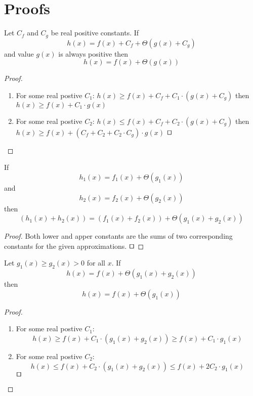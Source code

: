 \section{Proofs}
\label{sec:proofs_appendix}

\begin{lemma}
\label{lem:theta_constant}
Let $C_f$ and $C_g$ be real positive constants. If
\[ h(x) = f(x) + C_f + \Theta(g(x) + C_g) \]
and value $g(x)$ is always positive then
\[ h(x) = f(x) + \Theta(g(x)) \]
\end{lemma}
\begin{proof}
\begin{enumerate}
\item For some real  postive $C_1$: $h(x) \ge f(x) + C_f + C_1 \cdot (g(x) + C_g)$ then \\ $h(x) \ge f(x) + C_1 \cdot g(x)$
\item For some real  postive $C_2$: $h(x) \le f(x) + C_f + C_2 \cdot (g(x) + C_g)$ then \\ $h(x) \ge f(x) + (C_f + C_2 + C_2 \cdot C_g) \cdot g(x)$ $\qed$
\end{enumerate}
\end{proof}

\begin{lemma}
\label{lem:theta_sum}
If
\[ h_1(x) = f_1(x) + \Theta(g_1(x)) \]
and
\[ h_2(x) = f_2(x) + \Theta(g_2(x)) \]
then
\[ (h_1(x) + h_2(x)) = (f_1(x) + f_2(x)) + \Theta(g_1(x) + g_2(x)) \]
\end{lemma}
\begin{proof}
Both lower and apper constants are the sums of two corresponding constants for the given approximations. $\qed$
\end{proof}

\begin{lemma}
\label{lem:theta_absorb}
Let $g_1(x) \ge g_2(x) > 0$ for all $x$.
If
\[ h(x) = f(x) + \Theta(g_1(x) + g_2(x)) \]
then
\[ h(x) = f(x) + \Theta(g_1(x)) \]
\end{lemma}
\begin{proof}
\begin{enumerate}
\item For some real  postive $C_1$: \[ h(x) \ge f(x) + C_1 \cdot (g_1(x) + g_2(x)) \ge f(x) + C_1 \cdot g_1(x) \]
\item For some real  postive $C_2$: \[ h(x) \le f(x) + C_2 \cdot (g_1(x) + g_2(x)) \le f(x) + 2 C_2 \cdot g_1(x) \]
$\qed$
\end{enumerate}
\end{proof}

